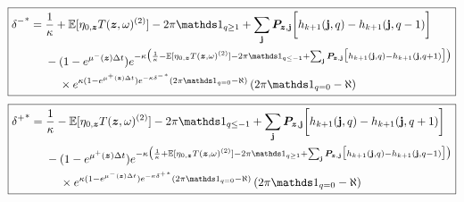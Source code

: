 \begin{equation}
\label{eq:discretedeltaminusfeedback}
\boxed{
\begin{split}
{\delta^-}^* & = \frac{1}{\kappa} + \E[\eta_{0,\bz} T(\bz, \omega)^{(2)}] - 2 \pi \indicator_{q \geq 1} + \sum_\bj \bP_{\bz,\bj} \biggl[ h_{k+1}(\bj, q) - h_{k+1}(\bj, q-1) \biggr] \\
& \hphantom{{}={}} - (1-e^{\mu^-(\bz) \Delta t})e^{-\kappa \bigl( \frac{1}{\kappa} - \E[\eta_{0,\bz} T(\bz, \omega)^{(2)}] - 2 \pi \indicator_{q \leq -1} + \sum_\bj \bP_{\bz,\bj} \bigl[ h_{k+1}(\bj, q) - h_{k+1}(\bj, q+1) \bigr] \bigr) } \\
& \hphantom{{}={} {}-{}} \times e^{\kappa (1-e^{\mu^+ (\bz) \Delta t})e^{-\kappa {\delta^-}^*} \left( 2 \pi \indicator_{q = 0} - \aleph \right)} \left( 2 \pi \indicator_{q = 0} - \aleph \right)
\end{split}
}
\end{equation}
\begin{equation}
\label{eq:discretedeltaplusfeedback}
\boxed{
\begin{split}
{\delta^+}^* & = \frac{1}{\kappa} - \E[\eta_{0,\bz} T(\bz, \omega)^{(2)}] - 2 \pi \indicator_{q \leq -1} + \sum_\bj \bP_{\bz,\bj} \biggl[ h_{k+1}(\bj, q) - h_{k+1}(\bj, q+1) \biggr] \\
& \hphantom{{}={}} - (1-e^{\mu^+ (\bz) \Delta t})e^{-\kappa \bigl( \frac{1}{\kappa} + \E[\eta_{0,\bz} T(\bz, \omega)^{(2)}] - 2 \pi \indicator_{q \geq 1} + \sum_\bj \bP_{\bz,\bj} \bigl[ h_{k+1}(\bj, q) - h_{k+1}(\bj, q-1) \bigr] \bigr) } \\
& \hphantom{{}={} {}-{}} \times e^{\kappa (1-e^{\mu^- (\bz) \Delta t})e^{-\kappa {\delta^+}^*} \left( 2 \pi \indicator_{q = 0} - \aleph \right)} \left( 2 \pi \indicator_{q = 0} - \aleph \right)
\end{split}
}
\end{equation}
